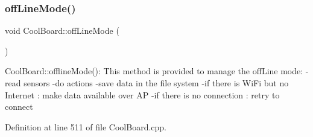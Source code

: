 \subsubsection{\texorpdfstring{off\+Line\+Mode()}{offLineMode()}}
{\footnotesize\ttfamily void Cool\+Board\+::off\+Line\+Mode (\begin{DoxyParamCaption}{ }\end{DoxyParamCaption})}

Cool\+Board\+::offline\+Mode()\+: This method is provided to manage the off\+Line mode\+: -\/read sensors -\/do actions -\/save data in the file system -\/if there is Wi\+Fi but no Internet \+: make data available over AP -\/if there is no connection \+: retry to connect 

Definition at line 511 of file Cool\+Board.\+cpp.


